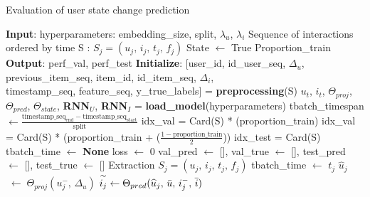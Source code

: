 \begin{algorithm}[H]
    \caption{Evaluation of user state change prediction}
    \begin{algorithmic} 
        \STATE \textbf{Input}: hyperparameters: embedding\_size, split, $\lambda_u$, $\lambda_i$
        \STATE \quad \hspace{0.73cm}Sequence of interactions ordered by time S : $S_j = (u_j,\,i_j,\,t_j,\,f_j)$
        \STATE \quad \hspace{0.73cm}State $\leftarrow$ True
        \STATE \quad \hspace{0.73cm}Proportion\_train
        \STATE \textbf{Output}: perf\_val, perf\_test
        \STATE \textbf{Initialize}: [user\_id, id\_user\_seq, $\Delta_u$, previous\_item\_seq, item\_id, id\_item\_seq, $\Delta_i$,\\
        \quad \hspace{1.2cm} timestamp\_seq, feature\_seq, y\_true\_labels] = \textbf{preprocessing}(S)
        \STATE \quad \hspace{1.2cm} $u_t$, $i_t$, $\Theta_{proj}$, $\Theta_{pred}$, $\Theta_{state}$, \textbf{RNN}$_U$, \textbf{RNN}$_I$ = \textbf{load\_model}(hyperparameters)
        \STATE \quad \hspace{1.2cm} tbatch\_timespan $\leftarrow \frac{\text{timestamp\_seq}_{\text{end}} - \text{timestamp\_seq}_{\text{start}}}{\text{split}}$
        \STATE \quad \hspace{1.2cm} idx\_val = Card(S) * (proportion\_train)
        \STATE \quad \hspace{1.2cm} idx\_val = Card(S) * (proportion\_train + ($\frac{1 - \text{proportion\_train}}{2}$))
        \STATE \quad \hspace{1.2cm} idx\_test = Card(S)
        \STATE \quad \hspace{1.2cm} tbatch\_time $\leftarrow$ \textbf{None}
        \STATE \quad \hspace{1.2cm} loss $\leftarrow$ 0
        \STATE \quad \hspace{1.2cm} val\_pred $\leftarrow$ [], val\_true $\leftarrow$ [], test\_pred $\leftarrow$ [], test\_true $\leftarrow$ []
            \STATE Extraction $S_j = (u_j,\,i_j,\,t_j,\,f_j)$
                \STATE tbatch\_time $\leftarrow$ $t_j$
            \ENDIF
            \STATE $\widehat u_j$ $\; \leftarrow \; \Theta_{proj}(u_j^-, \, \Delta_u)$
            \STATE $\overset{\sim}{i_j} \leftarrow \Theta_{pred}(\widehat u_j, \, \Bar{u}, \, i^-_j, \,\Bar{i})$

\end{algorithmic}
\end{algorithm}
